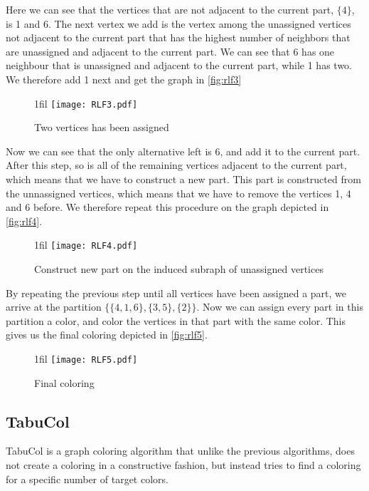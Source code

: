 \documentclass[a4paper]{article}
\makeatletter
\newcommand*{\centerfloat}{%
  \parindent \z@
  \leftskip \z@ \@plus 1fil \@minus \textwidth
  \rightskip\leftskip
  \parfillskip \z@skip}
\makeatother
\begin{document}
Here we can see that the vertices that are not adjacent to the current part,
$\{4\}$, is 1 and 6. The next vertex we add is the vertex among the unassigned
vertices not adjacent to the current part that has the
highest number of neighbors that are unassigned and adjacent to the current
part. We can see that 6 has one neighbour that is unassigned and adjacent to the
current part, while 1 has two. We therefore add 1 next and get the graph in
\autoref{fig:rlf3}

\begin{figure}[H]
    \centerfloat
    \texttt{[image: RLF3.pdf]}
    \caption{Two vertices has been assigned}
    \label{fig:rlf3}
\end{figure}

Now we can see that the only alternative left is 6, and add it to the current
part. After this step, so is all of the remaining vertices adjacent to the
current part, which means that we have to construct a new part. This part is
constructed from the unnassigned vertices, which means that we have to remove
the vertices  1, 4 and 6 before. We therefore repeat this procedure on the graph 
depicted in \autoref{fig:rlf4}.

\begin{figure}[H]
    \centerfloat
    \texttt{[image: RLF4.pdf]}
    \caption{Construct new part on the induced subraph of unassigned vertices}
    \label{fig:rlf4}
\end{figure}

By repeating the previous step until all vertices have been assigned a part, we 
arrive at the partition $\{\{4,1,6\},\{3,5\},\{2\}\}$. Now we can assign every
part in this partition a color, and color the vertices in that part with the same color. 
This gives us the final coloring depicted in \autoref{fig:rlf5}.

\begin{figure}[H]
    \centerfloat
    \texttt{[image: RLF5.pdf]}
    \caption{Final coloring}
    \label{fig:rlf5}
\end{figure}



\subsection{TabuCol}

TabuCol is a graph coloring algorithm that unlike the previous algorithms, does not
create a coloring in a constructive fashion, but instead tries to find a
coloring for a specific number of target colors.
\end{document}
